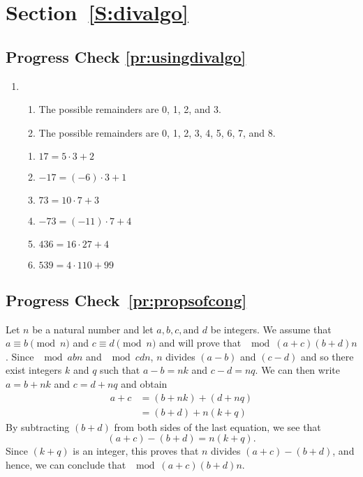 \section*{Section~\ref{S:divalgo}}

\subsection*{Progress Check \ref{pr:usingdivalgo}}
\begin{enumerate}
\item \begin{enumerate}
\item The possible remainders are 0, 1, 2, and 3.
\item The possible remainders are 0, 1, 2, 3, 4, 5, 6, 7, and 8.
\end{enumerate}

\begin{multicols}{2}
\begin{enumerate}
\item $17 = 5 \cdot 3 + 2$

\item $-17 = \left( -6 \right) \cdot 3 + 1$

\item $73 = 10 \cdot 7 + 3$

\item $-73 = \left( -11 \right) \cdot 7 + 4$

\item $436 = 16 \cdot 27 + 4$

\item $539 = 4 \cdot 110 + 99$
\end{enumerate}
\end{multicols}
\end{enumerate}



\subsection*{Progress Check~\ref{pr:propsofcong}}
\begin{myproof}
Let  $n$  be a natural number and let  $a, b, c, \text{and }  d$  be integers.  We assume that  
$a \equiv b \pmod n$ and $c \equiv d \pmod n$ and will prove that $\mod{(a + c)}{(b + d)}{n}$.  Since $\mod{a}{b}{n}$ and $\mod{c}{d}{n}$, $n$ divides $(a - b)$ and $(c - d)$ and so there exist integers $k$ and $q$ such that $a - b = nk$ and $c - d = nq$.  We can then write 
$a = b + nk$ and $c = d + nq$ and obtain
\begin{align*}
a + c &= (b + nk) + (d + nq) \\
      &= (b + d) + n(k + q)
\end{align*}
By subtracting $(b + d)$ from both sides of the last equation, we see that
\[
(a + c) - (b + d) = n(k + q).
\]
Since $(k + q)$ is an integer, this proves that $n$ divides $(a + c) - (b + d)$, and hence, we can conclude that $\mod{(a + c)}{(b + d)}{n}$.
\end{myproof}

